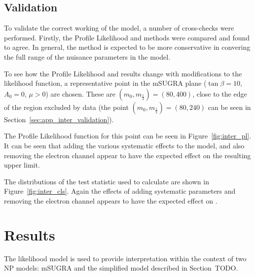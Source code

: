 \subsection{Validation}
To validate the correct working of the model, a number of cross-checks were
performed. Firstly, the Profile Likelihood and \CLs methods were compared and
found to agree. In general, the \CLs method is expected to be more conservative
in convering the full range of the nuisance parameters in the model.

To see how the Profile Likelihood and \CLs results change with modifications to
the likelihood function, a representative point in the \ac{mSUGRA} plane
($\tan\beta=10$, $A_0=0$, $\mu>0$) are chosen. These are $(m_0, m_{\frac{1}{2}})
= (80, 400)$, close to the edge of the region excluded by data (the point $(m_0,
m_{\frac{1}{2}}) = (80, 240)$ can be seen in
Section~\ref{sec:app_inter_validation}).

The Profile Likelihood function for this point can be seen in
Figure~\ref{fig:inter_pl}. It can be seen that adding the various systematic
effects to the model, and also removing the electron channel appear to have the
expected effect on the resulting upper limit.

The distributions of the test statistic used to calculate \CLs are shown in
Figure~\ref{fig:inter_cls}. Again the effects of adding systematic parameters
and removing the electron channel appears to have the expected effect on
\CLs.


\section{Results}
The likelihood model is used to provide interpretation within the context of two
\ac{NP} models: \ac{mSUGRA} and the \Ttwott simplified model described in
Section~TODO.

\begin{figure}[h!]
\centering
{}
\\
\caption[]{}
\label{fig:inter_msugra_mu}
\end{figure}

